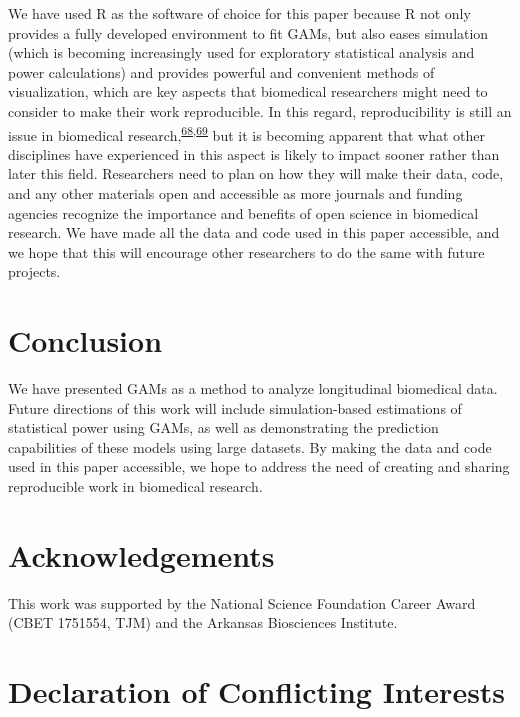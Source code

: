 \documentclass[
]{article}
\begin{document}
We have used R as the software of choice for this paper because R not only provides a fully developed environment to fit GAMs, but also eases simulation (which is becoming increasingly used for exploratory statistical analysis and power calculations) and provides powerful and convenient methods of visualization, which are key aspects that biomedical researchers might need to consider to make their work reproducible. In this regard, reproducibility is still an issue in biomedical research,\textsuperscript{\protect\hyperlink{ref-begley2015}{68},\protect\hyperlink{ref-weissgerber2018}{69}} but it is becoming apparent that what other disciplines have experienced in this aspect is likely to impact sooner rather than later this field. Researchers need to plan on how they will make their data, code, and any other materials open and accessible as more journals and funding agencies recognize the importance and benefits of open science in biomedical research. We have made all the data and code used in this paper accessible, and we hope that this will encourage other researchers to do the same with future projects.

\hypertarget{conclusion}{%
\section{Conclusion}\label{conclusion}}

We have presented GAMs as a method to analyze longitudinal biomedical data. Future directions of this work will include simulation-based estimations of statistical power using GAMs, as well as demonstrating the prediction capabilities of these models using large datasets.
By making the data and code used in this paper accessible, we hope to address the need of creating and sharing reproducible work in biomedical research.

\hypertarget{acknowledgements}{%
\section{Acknowledgements}\label{acknowledgements}}

This work was supported by the National Science Foundation Career Award (CBET 1751554, TJM) and the Arkansas Biosciences Institute.

\hypertarget{declaration-of-conflicting-interests}{%
\section{Declaration of Conflicting Interests}\label{declaration-of-conflicting-interests}}
\end{document}
